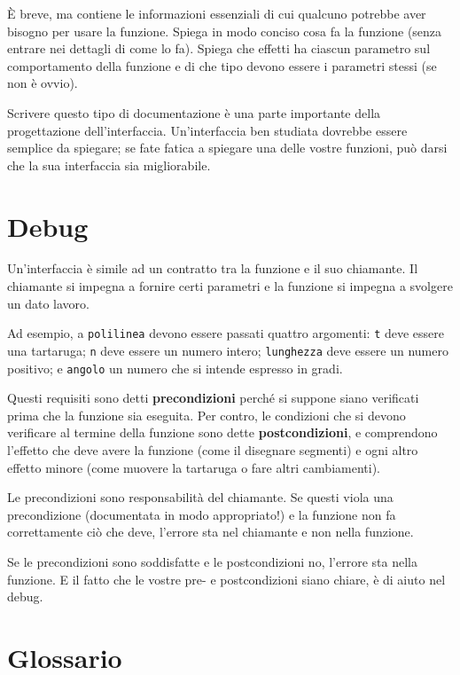 \documentclass[10pt]{book}
\begin{document}
È breve, ma contiene le informazioni essenziali di cui qualcuno potrebbe aver bisogno per usare la funzione. Spiega in modo conciso cosa fa la funzione (senza entrare nei dettagli di come lo fa). Spiega che effetti ha ciascun parametro sul comportamento della funzione e di che tipo devono essere i parametri stessi (se non è ovvio).

Scrivere questo tipo di documentazione è una parte importante della progettazione dell'interfaccia. Un'interfaccia ben studiata dovrebbe essere semplice da spiegare; se fate fatica a spiegare una delle vostre funzioni, può darsi che la sua interfaccia sia migliorabile.


\section{Debug}

Un'interfaccia è simile ad un contratto tra la funzione e il suo chiamante. Il chiamante si impegna a fornire certi parametri e la funzione si impegna a svolgere un dato lavoro.

Ad esempio, a {\tt polilinea} devono essere passati quattro argomenti: {\tt t} deve essere una tartaruga; {\tt n} deve essere un numero intero; {\tt lunghezza} deve essere un numero positivo; e {\tt angolo} un numero che si intende espresso in gradi.

Questi requisiti sono detti {\bf precondizioni} perché si suppone siano verificati prima che la funzione sia eseguita. Per contro, le condizioni che si devono verificare al termine della funzione sono dette {\bf postcondizioni},  e comprendono l'effetto che deve avere la funzione (come il disegnare segmenti) e ogni altro effetto minore (come muovere la tartaruga o fare altri cambiamenti).

Le precondizioni sono responsabilità del chiamante. Se questi viola una precondizione (documentata in modo appropriato!) e la funzione non fa correttamente ciò che deve, l'errore sta nel chiamante e non nella funzione.

Se le precondizioni sono soddisfatte e le postcondizioni no, l'errore sta nella funzione. E il fatto che le vostre pre- e postcondizioni siano chiare, è di aiuto nel debug.


\section{Glossario}
\end{document}
